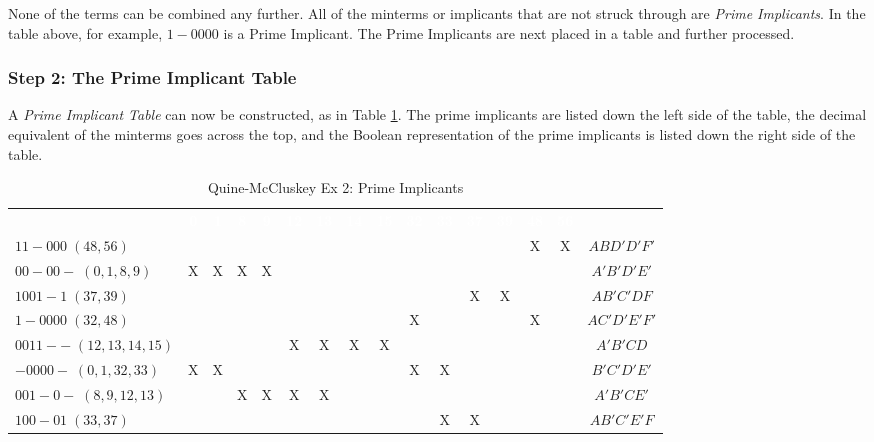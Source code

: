 None of the terms can be combined any further. All of the minterms or implicants that are not struck through are \emph{Prime Implicants}. In the table above, for example, $ 1-0000 $ is a Prime Implicant. The Prime Implicants are next placed in a table and further processed. 

\subsubsection{Step 2: The Prime Implicant Table}
\label{ASM:subsubsec:quine-mccluskey_ex_2_step_2}

A \emph{Prime Implicant Table} can now be constructed, as in Table \ref{ASM:tab:qm_ex_2_prime_implicants}. The prime implicants are listed down the left side of the table, the decimal equivalent of the minterms goes across the top, and the Boolean representation of the prime implicants is listed down the right side of the table. 

\begin{table}[H]
	\sffamily
	\newcommand{\head}[1]{\textcolor{white}{\textbf{#1}}}		
	\begin{center}
		\begin{adjustbox}{max width=\textwidth}
			\begin{tabular}{lccccccccccccccc} 
				\rowcolor{black!75}
				& \head{0} & \head{1} & \head{8} & \head{9}
				& \head{12} & \head{13} & \head{14} & \head{15}
				& \head{32} & \head{33} & \head{37} & \head{39} 
				& \head{48} & \head{56} & \\
				$ 11-000\;(48,56) $       &   &   &   &   &   &   &   &   &   &   &   &   & X & X & $ ABD'D'F' $ \\
				$ 00-00-\;(0,1,8,9) $     & X & X & X & X &   &   &   &   &   &   &   &   &   &   & $ A'B'D'E' $ \\
				$ 1001-1\;(37,39) $       &   &   &   &   &   &   &   &   &   &   & X & X &   &   & $ AB'C'DF $ \\
				$ 1-0000\;(32,48) $       &   &   &   &   &   &   &   &   & X &   &   &   & X &   & $ AC'D'E'F' $ \\
				$ 0011--\;(12,13,14,15) $ &   &   &   &   & X & X & X & X &   &   &   &   &   &   & $ A'B'CD $ \\
				$ -0000-\;(0,1,32,33) $   & X & X &   &   &   &   &   &   & X & X &   &   &   &   & $ B'C'D'E' $ \\
				$ 001-0-\;(8,9,12,13) $   &   &   & X & X & X & X &   &   &   &   &   &   &   &   & $ A'B'CE' $ \\
				$ 100-01\;(33,37) $       &   &   &   &   &   &   &   &   &   & X & X &   &   &   & $ AB'C'E'F $ \\
				\hline
			\end{tabular}
		\end{adjustbox}
	\end{center}
	\caption{Quine-McCluskey Ex 2: Prime Implicants}
  \label{ASM:tab:qm_ex_2_prime_implicants}
\end{table}

